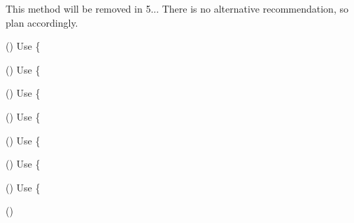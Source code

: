 \begin{DoxyRefList}
%
This method will be removed in 5... There is no alternative recommendation, so plan accordingly.  
\item[\doxylink{report_8contract_8php_a77b973d137fb33212e018b042df6e3e7}{Global(e)} \doxylink{namespace_ramsey_1_1_uuid_af66d1556704169933700e0570af220b2}{Ramsey\+::Uuid\+::get\+Time\+Hi\+And\+Version} ()]\label{deprecated__deprecated000144}%
%
Use \{ 
\item[\doxylink{report_8contract_8php_a77b973d137fb33212e018b042df6e3e7}{Global(e)} \doxylink{namespace_ramsey_1_1_uuid_ab5839e600f3302bd00bb85f4640d4b4c}{Ramsey\+::Uuid\+::get\+Time\+Hi\+And\+Version\+Hex} ()]\label{deprecated__deprecated000145}%
%
Use \{ 
\item[\doxylink{report_8contract_8php_a77b973d137fb33212e018b042df6e3e7}{Global(e)} \doxylink{namespace_ramsey_1_1_uuid_a45160120925d388b15802b9a5a0354e6}{Ramsey\+::Uuid\+::get\+Time\+Low} ()]\label{deprecated__deprecated000146}%
%
Use \{ 
\item[\doxylink{report_8contract_8php_a77b973d137fb33212e018b042df6e3e7}{Global(e)} \doxylink{namespace_ramsey_1_1_uuid_a4dcf26e67915bfd24202dbb503f5b09f}{Ramsey\+::Uuid\+::get\+Time\+Low\+Hex} ()]\label{deprecated__deprecated000147}%
%
Use \{ 
\item[\doxylink{report_8contract_8php_a77b973d137fb33212e018b042df6e3e7}{Global(e)} \doxylink{namespace_ramsey_1_1_uuid_a2b105a04ff09668e62f3f5da9ab7ff1f}{Ramsey\+::Uuid\+::get\+Time\+Mid} ()]\label{deprecated__deprecated000148}%
%
Use \{ 
\item[\doxylink{report_8contract_8php_a77b973d137fb33212e018b042df6e3e7}{Global(e)} \doxylink{namespace_ramsey_1_1_uuid_ab893d39f9b6e695d626d8325de0eed8f}{Ramsey\+::Uuid\+::get\+Time\+Mid\+Hex} ()]\label{deprecated__deprecated000149}%
%
Use \{ 
\item[\doxylink{report_8contract_8php_a77b973d137fb33212e018b042df6e3e7}{Global(e)} \doxylink{namespace_ramsey_1_1_uuid_a92aa1d82129ec8cd803d64c28efcb30f}{Ramsey\+::Uuid\+::get\+Timestamp} ()]\label{deprecated__deprecated000150}%
%
Use \{ 
\item[\doxylink{report_8contract_8php_a77b973d137fb33212e018b042df6e3e7}{Global(e)} \doxylink{namespace_ramsey_1_1_uuid_a0714feb0ae6089a4172a4252afe36e61}{Ramsey\+::Uuid\+::get\+Timestamp\+Hex} ()]\label{deprecated__deprecated000151}%

\end{DoxyRefList}
